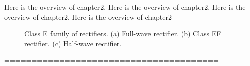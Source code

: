 Here is the overview of chapter2. Here is the overview of chapter2. Here is the overview of chapter2. Here is the overview of chapter2
\begin{figure}[!htb]
	\centering
	\caption{Class E family of rectifiers. (a) Full-wave rectifier. (b) Class EF rectifier. (c) Half-wave rectifier.}
	\label{fig:ClassEfamilyrectifier}
\end{figure}





\ifx\allfiles\undefined
	\onehalfspacing
	
	
	
\fi=======================================
